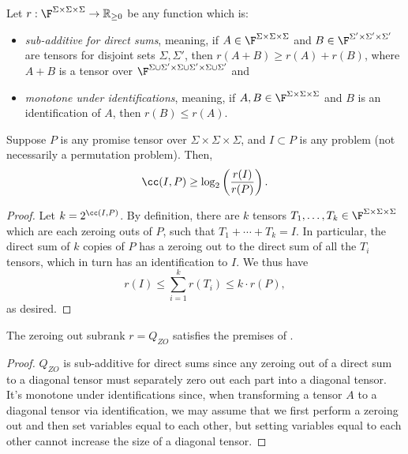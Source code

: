 \begin{theorem} \label{thm:asymptspectrum}
Let $r : \F^{\Sigma \times \Sigma \times \Sigma} \to \mathbb{R}_{\geq 0}$ be any function which is:
\begin{itemize}
    \item \emph{sub-additive for direct sums}, meaning, if $A \in \F^{\Sigma \times \Sigma \times \Sigma}$ and $B \in \F^{\Sigma' \times \Sigma' \times \Sigma'}$ are tensors for disjoint sets $\Sigma, \Sigma'$, then $r(A+B) \geq r(A) + r(B)$, where $A+B$ is a tensor over $\F^{\Sigma \cup \Sigma' \times \Sigma \cup \Sigma' \times \Sigma \cup \Sigma'}$ and
    \item \emph{monotone under identifications}, meaning, if  $A,B \in \F^{\Sigma \times \Sigma \times \Sigma}$ and $B$ is an identification of $A$, then $r(B) \leq r(A)$.
\end{itemize}

Suppose $P$ is any promise tensor over $\Sigma \times \Sigma \times \Sigma$, and $I \subset P$ is any problem (not necessarily a permutation problem). Then, $$\cc(I,P) \geq \log_2\left( \frac{r(I)}{r(P)} \right).$$
\end{theorem}

\begin{proof}
   Let $k = 2^{\cc(I,P)}$. By definition, there are $k$ tensors $T_1, \ldots, T_k \in \F^{\Sigma \times \Sigma \times \Sigma}$ which are each zeroing outs of $P$, such that $T_1 + \cdots + T_k = I$. In particular, the direct sum of $k$ copies of $P$ has a zeroing out to the direct sum of all the $T_i$ tensors, which in turn has an identification to $I$. We thus have $$r(I) \leq \sum_{i=1}^k r(T_i) \leq k \cdot r(P),$$
    as desired.
\end{proof}

\begin{fact}
    The zeroing out subrank $r = Q_{ZO}$ satisfies the premises of .
\end{fact}

\begin{proof}
    $Q_{ZO}$ is sub-additive for direct sums since any zeroing out of a direct sum to a diagonal tensor must separately zero out each part into a diagonal tensor. It's monotone under identifications since, when transforming a tensor $A$ to a diagonal tensor via identification, we may assume that we first perform a zeroing out and then set variables equal to each other, but setting variables equal to each other cannot increase the size of a diagonal tensor.
\end{proof}


